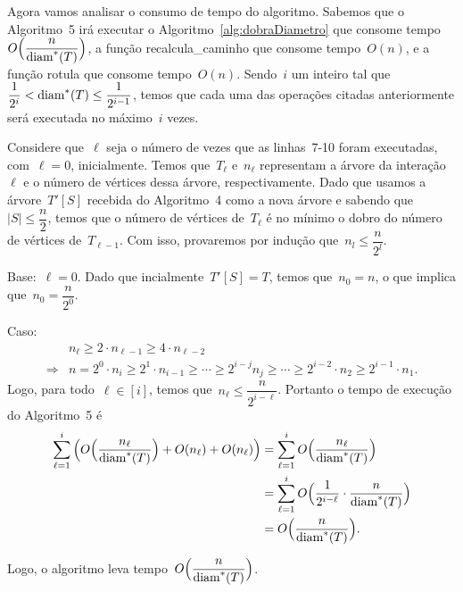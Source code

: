 		\bigskip

		Agora vamos analisar o consumo de tempo do algoritmo.
		Sabemos que o Algoritmo~5 
		irá executar
		o Algoritmo~\ref{alg:dobraDiametro} que consome 
		tempo ~${O\Big(\dfrac{n}{\mathrm{diam}^*(T)}\Big)}$, a função
		{\sc recalcula\_caminho} que consome tempo~$O(n)$, e a função
		{\sc rotula} que consome tempo~$O(n)$.
		Sendo~$i$ um inteiro tal que~${\dfrac{1}{2^i}< \mathrm{diam}^*(T)\le \dfrac{1}{2^{i-1}}}$, 
		temos que cada uma das operações citadas anteriormente
		será executada no máximo~$i$ vezes.

		Considere que~$\ell$ seja o número de vezes que
		as linhas~7-10 foram executadas, com~$\ell = 0$, inicialmente.
		Temos que~$T_\ell$ e~$n_\ell$ 
		representam a árvore da interação~$\ell$ e
		o número de vértices dessa árvore, respectivamente.
		Dado que usamos a árvore~$T'[S]$ recebida do Algoritmo~4 como a nova árvore
		e sabendo que~$|S|\le \dfrac{n}{2}$,
		temos que o número de vértices de~$T_{\ell}$
		é no mínimo o 
		dobro do número de vértices de~$T_{\ell-1}$.
		Com isso, provaremos por indução que~$n_l\le \dfrac{n}{2^l}$.

		Base:~$\ell = 0$. Dado que incialmente~$T'[S] = T$,
		temos que~$n_0 = n$, o que implica que~$n_0 = \dfrac{n}{2^0}$. 

		Caso: 
		\begin{align}
			 & n_{\ell} \ge 2\cdot n_{\ell-1} \ge 4\cdot n_{\ell-2} \nonumber\\
			\Rightarrow & n = 2^0\cdot n_i\ge 2^1\cdot n_{i-1} \ge\cdots\ge
			2^{i-j}n_j\ge\cdots\ge
			 2^{i-2}\cdot n_{2}\ge 2^{i-1}\cdot n_1. \nonumber 
		\end{align}
		Logo, para todo~$\ell\in[i]$, temos que~$n_\ell \le\dfrac{n} {2^{i-\ell}}$.
		Portanto o tempo de execução do Algoritmo~5 é
		\begin{align}
			\displaystyle\sum_{\ell=1}^{i} \Big(O\Big(\dfrac{n_\ell}{\mathrm{diam}^*(T)}\Big)
			+ O(n_\ell) + O(n_\ell)\Big)
			&= \displaystyle\sum_{\ell=1}^{i} O\Big(\dfrac{n_\ell}{\mathrm{diam}^*(T)}\Big) \nonumber\\
			&= \displaystyle\sum_{\ell=1}^{i} O\Big(\dfrac{1}{2^{i-\ell}}
			\cdot\dfrac{n}{\mathrm{diam}^*(T)}\Big) \nonumber\\
			&= O\Big(\dfrac{n}{\mathrm{diam}^*(T)}\Big). \nonumber
		\end{align}

		Logo, o algoritmo leva tempo~$O\Big(\dfrac{n}{\mathrm{diam}^*(T)}\Big)$.

		\bigskip
		\bigskip
		\bigskip
